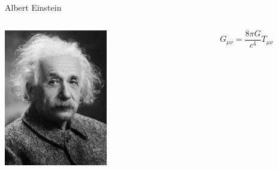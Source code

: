 \documentclass[aspectratio=169,xcolor=dvipsnames]{beamer}
\begin{document}
\fi
\begin{frame}{Albert Einstein}
    \begin{columns}[t]
    \begin{column}{4cm}

    \includegraphics[height=6cm]{einstein.jpg}
    \end{column}
    \begin{column}{7cm}


    \begin{varblock}
    \vspace{1cm}
    \Huge\[G_{\mu\nu}=\frac{8\pi G}{c{^4}}T_{\mu\nu}\]
    \end{varblock}
    \end{column}
    \end{columns}
     
\end{frame}
\iffalse
\end{document}
